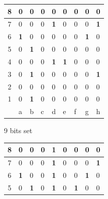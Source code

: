 \documentclass[12pt,a4paper,twoside,openright]{book}
\begin{document}
\begin{figure}[htpb]
\begin{subfigure}[b]{0.45\textwidth}
\centering
\begin{tabular}{|c|*{8}{>{\centering\arraybackslash}p{0.3cm}|}}
\hline
{\scriptsize 8} & \tiny 0 & \tiny 0 & \tiny 0 & \tiny 0 & \tiny 0 & \tiny 0 & \tiny 0 & \tiny 0 \\[2pt] \hline
{\scriptsize 7} & \tiny 0 & \tiny 0 & \tiny 0 & \tiny\textbf{1} & \tiny 0 & \tiny 0 & \tiny 0 & \tiny\textbf{1} \\[2pt] \hline
{\scriptsize 6} & \tiny\textbf{1} & \tiny 0 & \tiny 0 & \tiny 0 & \tiny 0 & \tiny 0 & \tiny\textbf{1} & \tiny 0 \\[2pt] \hline
{\scriptsize 5} & \tiny 0 & \tiny\textbf{1} & \tiny 0 & \tiny 0 & \tiny 0 & \tiny 0 & \tiny 0 & \tiny 0 \\[2pt] \hline
{\scriptsize 4} & \tiny 0 & \tiny 0 & \tiny 0 & \tiny\textbf{1} & \tiny\textbf{1} & \tiny 0 & \tiny 0 & \tiny 0 \\[2pt] \hline
{\scriptsize 3} & \tiny 0 & \tiny\textbf{1} & \tiny 0 & \cellcolor{lightgray}\tiny 0 & \tiny 0 & \tiny 0 & \tiny 0 & \tiny\textbf{1} \\[2pt] \hline
{\scriptsize 2} & \tiny 0 & \tiny 0 & \tiny 0 & \tiny 0 & \tiny 0 & \tiny 0 & \tiny 0 & \tiny 0 \\[2pt] \hline
{\scriptsize 1} & \tiny 0 & \tiny\textbf{1} & \tiny 0 & \tiny 0 & \tiny 0 & \tiny 0 & \tiny 0 & \tiny 0 \\[2pt] \hline
\multicolumn{1}{c|}{} & \scriptsize a & \scriptsize b & \scriptsize c & \scriptsize d & \scriptsize e & \scriptsize f & \scriptsize g & \scriptsize h \\
\cline{2-9}
\end{tabular}
\caption{9 bits set}
\end{subfigure}
\hfill
\begin{subfigure}[b]{0.45\textwidth}
\centering
\begin{tabular}{|c|*{8}{>{\centering\arraybackslash}p{0.3cm}|}}
\hline
{\scriptsize 8} & \tiny 0 & \tiny 0 & \tiny 0 & \tiny\textbf{1} & \tiny 0 & \tiny 0 & \tiny 0 & \tiny 0 \\[2pt] \hline
{\scriptsize 7} & \tiny 0 & \tiny 0 & \tiny 0 & \tiny\textbf{1} & \tiny 0 & \tiny 0 & \tiny 0 & \tiny\textbf{1} \\[2pt] \hline
{\scriptsize 6} & \tiny\textbf{1} & \tiny 0 & \tiny 0 & \tiny\textbf{1} & \tiny 0 & \tiny 0 & \tiny\textbf{1} & \tiny 0 \\[2pt] \hline
{\scriptsize 5} & \tiny 0 & \tiny\textbf{1} & \tiny 0 & \tiny\textbf{1} & \tiny 0 & \tiny\textbf{1} & \tiny 0 & \tiny 0 \\[2pt] \hline

\end{tabular}
\end{subfigure}
\end{figure}
\end{document}
